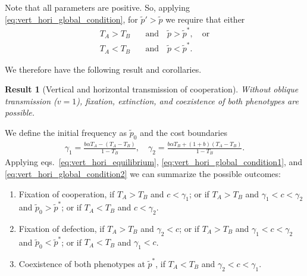 \documentclass[12pt]{extarticle}
\newtheorem{result}{Result}
\begin{document}
{Note that all parameters are positive.
So, applying \autoref{eq:vert_hori_global_condition}, for $\tilde{p}'>\tilde{p}$ we require that either 
\begin{align} 
\label{eq:vert_hori_global_condition1}
T_A > T_B \quad&\text{and}\quad \tilde{p}>\tilde{p}^*,  \quad \text{or} \\
\label{eq:vert_hori_global_condition2}
T_A <T_B \quad&\text{and}\quad \tilde{p}<\tilde{p}^* .
\end{align}

We therefore have the following result and corollaries.\\

\begin{result}[Vertical and horizontal transmission of cooperation]
Without oblique transmission ($v=1$), fixation, extinction, and coexistence of both phenotypes are possible.
\end{result}

We define the initial frequency as $\tilde{p}_0$ and the cost boundaries
\begin{equation}\begin{aligned}
\gamma_1 = \frac{b \alpha T_A - (T_A - T_B)}{1-T_B}, \quad
\gamma_2 = \frac{b \alpha T_B + (1+b) (T_A - T_B)}{1-T_B}.
\end{aligned}\end{equation}
Applying eqs.~\ref{eq:vert_hori_equilibrium}, \ref{eq:vert_hori_global_condition1}, and \ref{eq:vert_hori_global_condition2} we can summarize the possible outcomes:
\begin{enumerate} %
\item Fixation of cooperation,
	if $T_A>T_B$ and $c<\gamma_1$; or
	if $T_A>T_B$ and $\gamma_1<c<\gamma_2$ and $\tilde{p}_0>\tilde{p}^*$; or
	if $T_A<T_B$ and $c<\gamma_2$.
\item Fixation of defection,
	if $T_A>T_B$ and $\gamma_2<c$; or
	if $T_A>T_B$ and $\gamma_1<c<\gamma_2$ and $\tilde{p}_0<\tilde{p}^*$; or
	if $T_A<T_B$ and $\gamma_1<c$.
\item Coexistence of both phenotypes at $\tilde{p}^*$, 
	if $T_A<T_B$ and $\gamma_2<c<\gamma_1$.


\end{enumerate}}
\end{document}
